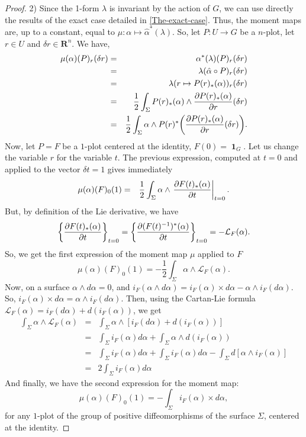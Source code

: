 \documentclass[10pt,reqno,twoside]{amsart}
\newcommand{\RR}{\mathbf{R}}
\DeclareMathOperator{\id}{\mathbf{1}}
\newcommand{\undemi}{\frac{1}{2}}
\newcommand{\DLie}{\mathcal{L}} %
\theoremstyle{plain}
\theoremstyle{definition}
\begin{document}
\begin{proof}
    2) Since the 1-form $\lambda$ is invariant by the action of $G$,
    we can use directly the results of the exact case detailed in \ref{The-exact-case}.
    Thus,
    the moment maps are,
    up to a constant,
    equal to $\mu : \alpha \mapsto \hat \alpha^*(\lambda)$.
    So,
    let $P : U \to G$ be a $n$-plot,
    let $r \in U$ and $\delta r \in \RR^n$.
    We have,
    \begin{eqnarray*}
      \mu(\alpha)(P)_r(\delta r) & = & \alpha^*(\lambda)(P)_r(\delta r) \\
      & = & \lambda(\hat \alpha \circ P)_r(\delta r) \\
      & = & \lambda(r \mapsto P (r)_*(\alpha))_r(\delta r) \\
      & = & \undemi \int_\Sigma P (r)_*(\alpha) \wedge {\partial P (r)_*(\alpha) \over \partial r}(\delta r) \\
      & = & \undemi \int_\Sigma \alpha \wedge P (r)^*\bigg({\partial P (r)_*(\alpha) \over \partial r}(\delta r)\bigg).
    \end{eqnarray*}
    Now,
    let $P = F$ be a $1$-plot centered at the identity,
    $F(0) = \id_G$.
    Let us change the variable $r$ for the variable $t$.
    The previous expression,
    computed at $t = 0$ and applied to the vector $\delta t = 1$ gives immediately
    \begin{eqnarray*}
      \mu(\alpha)(F)_0(1) & = & \undemi \int_\Sigma \alpha \wedge \left.{\partial F(t)_*(\alpha) \over \partial t}\right|_{t=0}.
    \end{eqnarray*}
    But,
    by definition of the Lie derivative,
    we have
    $$ \bigg\{{\partial F(t)_*(\alpha) \over \partial t} \bigg\}_{t = 0} = \bigg\{ {\partial (F(t)^{-1})^*(\alpha) \over \partial t}\bigg\}_{t = 0} = - \DLie_F(\alpha).
      $$
    So,
    we get the first expression of the moment map $\mu$ applied to $F$
    $$
      \mu(\alpha)(F)_0(1) = - \undemi \int_\Sigma \alpha\wedge\DLie_F(\alpha).
      $$
    Now,
    on a surface $\alpha \wedge d\alpha = 0$,
    and $i_F(\alpha \wedge d\alpha) = i_F(\alpha) \times d\alpha - \alpha \wedge i_F(d\alpha)$.
    So,
    $i_F(\alpha) \times d\alpha = \alpha \wedge i_F(d\alpha)$.
    Then,
    using the Cartan-Lie formula $\DLie_F(\alpha) = i_F(d\alpha) + d(i_F(\alpha))$,
    we get
    \begin{eqnarray*}
      \int_\Sigma\alpha\wedge\DLie_F(\alpha) & = & \int_\Sigma\alpha\wedge[i_F(d\alpha) + d(i_F(\alpha))] \\
      & = & \int_\Sigma i_F(\alpha)d\alpha + \int_\Sigma \alpha \wedge d(i_F(\alpha)) \\
      & = & \int_\Sigma i_F(\alpha)d\alpha + \int_\Sigma i_F(\alpha)d\alpha - \int_\Sigma d[\alpha \wedge i_F(\alpha)] \\
      & = & 2 \int_\Sigma i_F(\alpha)d\alpha
    \end{eqnarray*}
    And finally,
    we have the second expression for the moment map:
    $$ \mu(\alpha)(F)_0(1) = - \int_\Sigma i_F(\alpha) \times d\alpha,
      $$
    for any $1$-plot of the group of positive diffeomorphisms of the surface $\Sigma$,
    centered at the identity.
  \end{proof}
  
\end{document}
